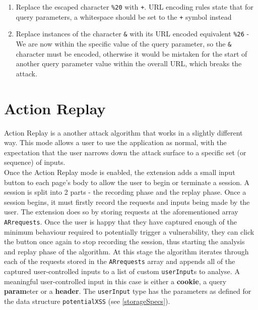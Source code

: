 \begin{enumerate}
	\item Replace the escaped character \texttt{\%20} with \texttt{+}. URL encoding rules state that for query parameters, a whitespace should be set to the \texttt{+} symbol instead
	
	\item Replace instances of the character \texttt{\&} with its URL encoded equivalent \texttt{\%26} - We are now within the specific value of the query parameter, so the \texttt{\&} character must be encoded, otherwise it would be mistaken for the start of another query parameter value within the overall URL, which breaks the attack.
\end{enumerate} 

\section{Action Replay}

Action Replay is a another attack algorithm that works in a slightly different way. This mode allows a user to use the application as normal, with the expectation that the user narrows down the attack surface to a specific set (or sequence) of inputs. \\

Once the Action Replay mode is enabled, the extension adds a small input button to each page's body to allow the user to begin or terminate a session. A session is split into 2 parts - the recording phase and the replay phase. Once a session begins, it must firstly record the requests and inputs being made by the user. The extension does so by storing requests at the aforementioned array \texttt{ARrequests}. Once the user is happy that they have captured enough of the minimum behaviour required to potentially trigger a vulnerability, they can click the button once again to stop recording the session, thus starting the analysis and replay phase of the algorithm. At this stage the algorithm iterates through each of the requests stored in the \texttt{ARrequests} array and appends all of the captured user-controlled inputs to a list of custom \texttt{userInput}s to analyse. A meaningful user-controlled input in this case is either a \textbf{cookie}, a query \textbf{param}eter or a \textbf{header}. The \texttt{userInput} type has the parameters as defined for the data structure \texttt{potentialXSS} (see \ref{storageSpecs}). \\

